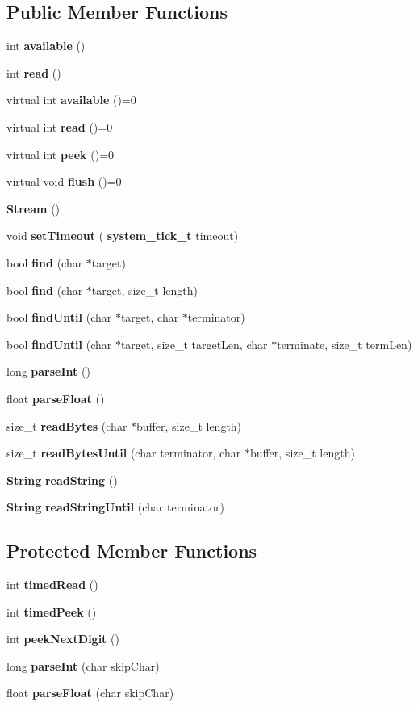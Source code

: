 \subsection*{Public Member Functions}
\begin{DoxyCompactItemize}
\item 
int \textbf{ available} ()
\item 
int \textbf{ read} ()
\item 
virtual int \textbf{ available} ()=0
\item 
virtual int \textbf{ read} ()=0
\item 
virtual int \textbf{ peek} ()=0
\item 
virtual void \textbf{ flush} ()=0
\item 
\textbf{ Stream} ()
\item 
void \textbf{ set\+Timeout} (\textbf{ system\+\_\+tick\+\_\+t} timeout)
\item 
bool \textbf{ find} (char $\ast$target)
\item 
bool \textbf{ find} (char $\ast$target, size\+\_\+t length)
\item 
bool \textbf{ find\+Until} (char $\ast$target, char $\ast$terminator)
\item 
bool \textbf{ find\+Until} (char $\ast$target, size\+\_\+t target\+Len, char $\ast$terminate, size\+\_\+t term\+Len)
\item 
long \textbf{ parse\+Int} ()
\item 
float \textbf{ parse\+Float} ()
\item 
size\+\_\+t \textbf{ read\+Bytes} (char $\ast$buffer, size\+\_\+t length)
\item 
size\+\_\+t \textbf{ read\+Bytes\+Until} (char terminator, char $\ast$buffer, size\+\_\+t length)
\item 
\textbf{ String} \textbf{ read\+String} ()
\item 
\textbf{ String} \textbf{ read\+String\+Until} (char terminator)
\end{DoxyCompactItemize}
\subsection*{Protected Member Functions}
\begin{DoxyCompactItemize}
\item 
int \textbf{ timed\+Read} ()
\item 
int \textbf{ timed\+Peek} ()
\item 
int \textbf{ peek\+Next\+Digit} ()
\item 
long \textbf{ parse\+Int} (char skip\+Char)
\item 
float \textbf{ parse\+Float} (char skip\+Char)
\end{DoxyCompactItemize}
